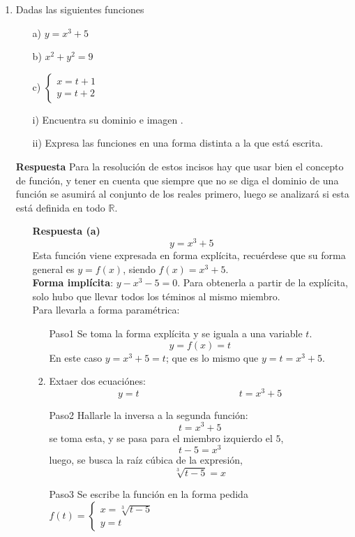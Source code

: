 \documentclass[10pt,twoside]{SelfArx} %
\begin{document}
\begin{enumerate}
	\item Dadas las siguientes funciones %
		\begin{enumerate}
			\item[a)]$  y=x^{3}+5  $
			\item[b)] $ x^{2}+y^{2}=9 $ 
			\item[c)] $ \begin{cases}
			x=t+1\\
			y=t+2
			\end{cases} $ 
		\end{enumerate}
		\begin{enumerate}
			\item[i)]		Encuentra su dominio e imagen .
			\item[ii)]		Expresa las funciones en una forma distinta a la que está escrita.
		\end{enumerate}
\textbf{Respuesta}	%
Para la resolución de estos incisos hay que usar bien el concepto de función, y tener en cuenta que siempre que no se diga el dominio de una función se asumirá al conjunto de los reales primero, luego se analizará si esta está definida en todo $ \mathbb{R} $.
\begin{enumerate}
	\item[\textbf{Respuesta (a)}]
	\[ y=x^{3}+5 \]
	Esta funci\'on viene expresada en forma expl\'icita, recu\'erdese  que su forma general es $ y=f(x) $, siendo $ f(x)=x^{3}+5 $.\\
	\textbf{Forma impl\'icita}: $ y-x^{3}-5=0 $. Para obtenerla a partir de la expl\'icita, solo hubo que llevar todos los t\'eminos al mismo miembro.\\
	Para llevarla a forma param\'etrica:\\
	\begin{enumerate}
		\item[Paso1]	Se toma la forma expl\'icita y se iguala a una variable $ t $.\\
		\[  y=f(x)=t  \]
		En este caso $ y=x^{3}+5=t $; que es lo mismo que $ y=t=x^{3}+5 $.
		\item	Extaer dos ecuaci\'ones: 
		\[ y=t\;\;\;\;\;\;\;\;\;\;\;\;\;\;\;\;\;\;\;\;\;\;\;\;\;\;\;\;\;\;\;\;\;\;\;\;\ t=x^{3}+5 \]
		\item[Paso2]	Hallarle la inversa a la segunda funci\'on:
		\[ t=x^{3}+5 \]
		se toma esta, y se pasa para el miembro izquierdo el $ 5 $,
		\[ t-5=x^{3} \]
		luego, se busca la ra\'iz c\'ubica de la expresi\'on,
		\[ \sqrt[3]{t-5}=x \]
		\item[Paso3] Se escribe la funci\'on en la forma pedida $ f(t)=\begin{cases}
		x=\sqrt[3]{t-5}\\
		y=t
		\end{cases} $
	\end{enumerate}
	

\end{enumerate}
\end{enumerate}
\end{document}

